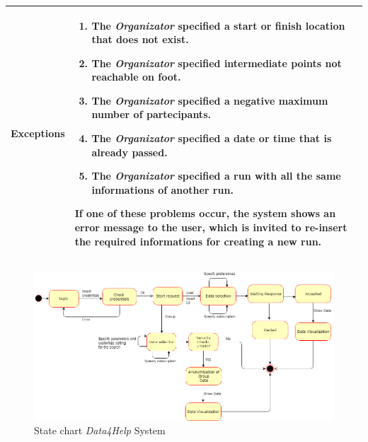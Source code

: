 \begin{table}[H]
\begin{tabular}{|p{3.5cm}|p{10.3cm}|}
    \hline
    \textbf{\large{Exceptions}} 		& \begin{enumerate}[leftmargin=0.5cm]
                                          	\item The \emph{Organizator} specified a start or finish location that does not exist.
                                            \item The \emph{Organizator} specified intermediate points not reachable on foot.
                                             \item The \emph{Organizator} specified a negative maximum number of partecipants.
                                            \item The \emph{Organizator} specified a date or time that is already passed.
                                            \item The \emph{Organizator} specified a run with all the same informations of another run.
                                          \end{enumerate}
    										If one of these problems occur, the system shows an error message to the user, which is invited to re-insert the required informations for creating a new run.\\
    
    \hline
    
    
    \end{tabular}
	
\end{table}

\begin{figure}[H]
    \centering
    \includegraphics[scale=0.4]{Pictures/state chart 1.png}
    \caption{State chart  \emph{Data4Help} System}
\end{figure}
